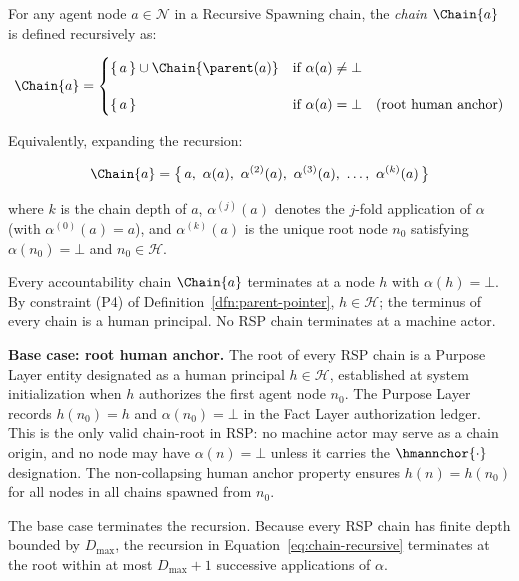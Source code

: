 \begin{dfn}\label{dfn:chain-operator}
For any agent node $a \in \mathcal{N}$ in a Recursive Spawning chain, the \emph{chain} $\Chain{a}$ is defined recursively as:

\begin{equation}
\Chain{a} =
\begin{cases}
\{\, a \,\} \cup \Chain{\parent(a)} & \text{if } \alpha(a) \neq \bot \\[12pt]
\{\, a \,\} & \text{if } \alpha(a) = \bot \quad \text{(root human anchor)}
\end{cases}
\label{eq:chain-recursive}
\end{equation}

Equivalently, expanding the recursion:

\begin{equation}
\Chain{a} = \bigl\{\, a,\ \alpha(a),\ \alpha^{(2)}(a),\ \alpha^{(3)}(a),\ \ldots,\ \alpha^{(k)}(a) \,\bigr\}
\label{eq:chain-expanded}
\end{equation}

where $k$ is the chain depth of $a$, $\alpha^{(j)}(a)$ denotes the $j$-fold application of $\alpha$ (with $\alpha^{(0)}(a) = a$), and $\alpha^{(k)}(a)$ is the unique root node $n_0$ satisfying $\alpha(n_0) = \bot$ and $n_0 \in \mathcal{H}$.
\end{dfn}

\begin{cor}\label{cor:chain-termination}
Every accountability chain $\Chain{a}$ terminates at a node $h$ with $\alpha(h) = \bot$. By constraint (P4) of Definition~\ref{dfn:parent-pointer}, $h \in \mathcal{H}$; the terminus of every chain is a human principal. No RSP chain terminates at a machine actor.
\end{cor}

\medskip
\noindent\textbf{Base case: root human anchor.} The root of every RSP chain is a Purpose Layer entity designated as a human principal $h \in \mathcal{H}$, established at system initialization when $h$ authorizes the first agent node $n_0$. The Purpose Layer records $h(n_0) = h$ and $\alpha(n_0) = \bot$ in the Fact Layer authorization ledger. This is the only valid chain-root in RSP: no machine actor may serve as a chain origin, and no node may have $\alpha(n) = \bot$ unless it carries the $\hmannchor{\cdot}$ designation. The non-collapsing human anchor property ensures $h(n) = h(n_0)$ for all nodes in all chains spawned from $n_0$.

The base case terminates the recursion. Because every RSP chain has finite depth bounded by $D_{\max}$, the recursion in Equation~\ref{eq:chain-recursive} terminates at the root within at most $D_{\max} + 1$ successive applications of $\alpha$.


